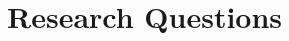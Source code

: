 \documentclass[
    a4paper,            %
    11pt,               %
    stu,                %
    donotrepeattitle,   %
    noextraspace,       %
    floatsintext,       %
    biblatex,           %
    colorlinks=true,        %
    linkcolor=red,          %
    anchorcolor=black,      %
    citecolor=blue,         %
    urlcolor=blue,          %
    bookmarks=true,         %
    bookmarksopen=false,    %
    bookmarksnumbered=true  %
]{apa7}
\begin{document}
\section{Research Questions}
\end{document}
